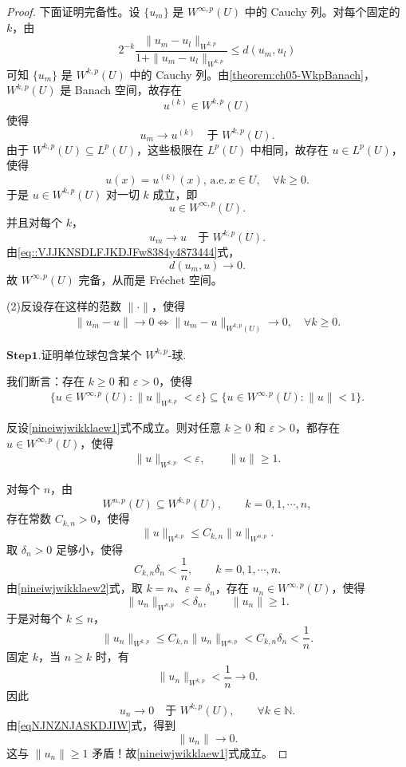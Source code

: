 \documentclass[../../main.tex]{subfiles}
\begin{document}
\begin{proof}
下面证明完备性。设 \(\{u_m\}\) 是 \(W^{\infty,p}(U)\) 中的 Cauchy 列。对每个固定的 \(k\)，由
\[
2^{-k}\frac{\|u_m-u_l\|_{W^{k,p}}}{1+\|u_m-u_l\|_{W^{k,p}}}
\leqslant d(u_m,u_l)
\]
可知 \(\{u_m\}\) 是 \(W^{k,p}(U)\) 中的 Cauchy 列。由\cref{theorem:ch05-WkpBanach}，\(W^{k,p}(U)\) 是 Banach 空间，故存在
\[
u^{(k)}\in W^{k,p}(U)
\]
使得
\[
u_m\to u^{(k)}\quad\text{于 }W^{k,p}(U).
\]
由于 \(W^{k,p}(U)\subseteq L^{p}(U)\)，这些极限在 \(L^{p}(U)\) 中相同，故存在 \(u\in L^{p}(U)\)，使得
\[
u(x)=u^{(k)}(x),\,\text{a.e.}\,x\in U,\quad \forall k\geqslant0.
\]
于是 \(u\in W^{k,p}(U)\) 对一切 \(k\) 成立，即
\[
u\in W^{\infty,p}(U).
\]
并且对每个 \(k\)，
\[
u_m\to u\quad\text{于 }W^{k,p}(U).
\]
由\eqref{eq::VJJKNSDLFJKDJFw8384y4873444}式，
\[
d(u_m,u)\to0.
\]
故 \(W^{\infty,p}(U)\) 完备，从而是 Fréchet 空间。

(2)反设存在这样的范数 \(\|\cdot\|\)，使得
\begin{align}
\|u_m-u\|\to0
\iff
\|u_m-u\|_{W^{k,p}(U)}\to0,\quad \forall k\geqslant0.\label{eqNJNZNJASKDJIW}
\end{align}

\noindent$\mathbf{Step}\bm{1}$.{\heiti 证明单位球包含某个 \(W^{k,p}\)-球.}

我们断言：存在 \(k\geqslant0\) 和 \(\varepsilon>0\)，使得
\begin{align}
\{u\in W^{\infty,p}(U):\|u\|_{W^{k,p}}<\varepsilon\}
\subseteq
\{u\in W^{\infty,p}(U):\|u\|<1\}.\label{nineiwjwikklaew1}
\end{align}

反设\eqref{nineiwjwikklaew1}式不成立。则对任意 \(k\geqslant0\) 和 \(\varepsilon>0\)，都存在 \(u\in W^{\infty,p}(U)\)，使得
\begin{align}
\|u\|_{W^{k,p}}<\varepsilon,
\qquad
\|u\|\geqslant1.
\label{nineiwjwikklaew2}
\end{align}

对每个 \(n\)，由
\[
W^{n,p}(U)\subseteq W^{k,p}(U),\qquad k=0,1,\cdots,n,
\]
存在常数 \(C_{k,n}>0\)，使得
\[
\|u\|_{W^{k,p}}\leqslant C_{k,n}\|u\|_{W^{n,p}}.
\]
取 \(\delta_n>0\) 足够小，使得
\[
C_{k,n}\delta_n<\frac1n,\qquad k=0,1,\cdots,n.
\]
由\eqref{nineiwjwikklaew2}式，取 \(k=n\)、\(\varepsilon=\delta_n\)，存在 \(u_n\in W^{\infty,p}(U)\)，使得
\[
\|u_n\|_{W^{n,p}}<\delta_n,
\qquad
\|u_n\|\geqslant1.
\]
于是对每个 \(k\leqslant n\)，
\[
\|u_n\|_{W^{k,p}}
\leqslant C_{k,n}\|u_n\|_{W^{n,p}}
<C_{k,n}\delta_n
<\frac1n.
\]
固定 \(k\)，当 \(n\geqslant k\) 时，有
\[
\|u_n\|_{W^{k,p}}<\frac1n\to0.
\]
因此
\[
u_n\to0\quad\text{于 }W^{k,p}(U),\qquad \forall k\in \mathbb{N}.
\]
由\eqref{eqNJNZNJASKDJIW}式，得到
\[
\|u_n\|\to0.
\]
这与 \(\|u_n\|\geqslant1\) 矛盾！故\eqref{nineiwjwikklaew1}式成立。


\end{proof}
\end{document}
